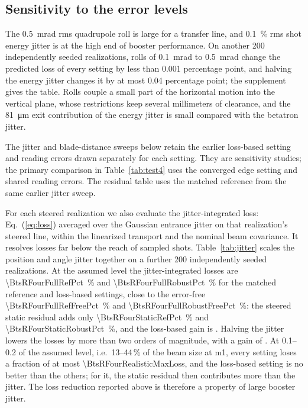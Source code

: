 \documentclass[final,5p,twocolumn]{elsarticle}
\begin{document}
\subsection{Sensitivity to the error levels}\label{sec:sensitivity}
The \SI{0.5}{\milli\radian} rms quadrupole roll is large for a transfer line, and \SI{0.1}{\percent} rms shot
energy jitter is at the high end of booster performance. On another 200 independently
seeded realizations, rolls of \SI{0.1}{\milli\radian} to \SI{0.5}{\milli\radian} change the predicted loss of every
setting by less than 0.001 percentage point, and halving the energy jitter changes it by
at most 0.04 percentage point; the supplement gives the table. Rolls couple a small part
of the horizontal motion into the vertical plane, whose restrictions keep several
millimeters of clearance, and the \SI{81}{\micro\metre} exit contribution of the energy jitter is small
compared with the betatron jitter.

The jitter and blade-distance sweeps below retain the earlier loss-based setting
and reading errors drawn separately for each setting. They are sensitivity studies;
the primary comparison in Table~\ref{tab:test4} uses the converged edge setting and
shared reading errors. The residual table uses the matched reference from the
same earlier jitter sweep.

For each steered realization we also evaluate the jitter-integrated loss:
Eq.~(\ref{eq:loss}) averaged over the Gaussian entrance jitter on that realization's
steered line, within the linearized transport and the nominal beam covariance. It
resolves losses far below the reach of sampled shots. Table~\ref{tab:jitter} scales the position and angle jitter together on a further
200 independently seeded realizations. At the assumed level the jitter-integrated
losses are \SI{\BtsRFourFullRefPct}{\percent} and \SI{\BtsRFourFullRobustPct}{\percent} for the matched reference and loss-based
settings, close to the error-free \SI{\BtsRFourFullRefFreePct}{\percent} and \SI{\BtsRFourFullRobustFreePct}{\percent}: the steered static residual
adds only \SI{\BtsRFourStaticRefPct}{\percent} and \SI{\BtsRFourStaticRobustPct}{\percent}, and the loss-based gain is \BtsRFourGainFull. Halving the jitter
lowers the losses by more than two orders of magnitude, with a gain of \BtsRFourGainHalf. At
0.1--0.2 of the assumed level, i.e.\ 13--44\,\% of the beam size at m1, every
setting loses a fraction of at most \num{\BtsRFourRealisticMaxLoss}, and the loss-based setting is no better
than the others; for it, the static residual then contributes more than the jitter. The loss
reduction reported above is therefore a property of large booster jitter.
\end{document}
